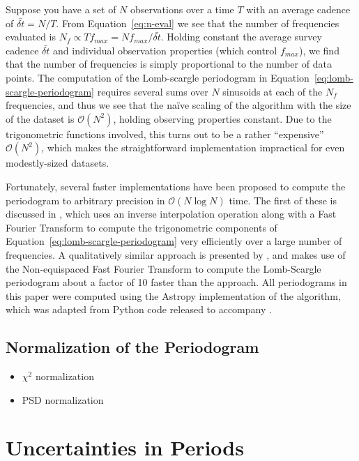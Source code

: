 \documentclass[preprint]{aastex}
\newcommand{\Eq}[1]{Equation~\ref{eq:#1}}
\newcommand{\eq}[1]{\Eq{#1}}
\newcommand{\sectlabel}[1]{\label{sect:#1}}
\begin{document}
Suppose you have a set of $N$ observations over a time $T$ with an average
cadence of $\bar{\delta t} = N/T$.
From \eq{n-eval} we see that the number of frequencies evaluated is
$N_f \propto T f_{max} = N f_{max} / \bar{\delta t}$.
Holding constant the average survey cadence $\bar{\delta t}$ and individual
observation properties (which control $f_{max}$), we find that the number of
frequencies is simply proportional to the number of data points.
The computation of the Lomb-scargle periodogram in \eq{lomb-scargle-periodogram}
requires several sums over $N$ sinusoids at each of the
$N_f$ frequencies, and thus we see that the
na{\"i}ve scaling of the algorithm with the size of the dataset is
$\mathcal{O}(N^2)$, holding observing properties constant.
Due to the trigonometric functions involved, this turns out to be a rather
``expensive'' $\mathcal{O}(N^2)$, which makes the straightforward
implementation impractical for even modestly-sized datasets.

Fortunately, several faster implementations have been proposed to compute the
periodogram to arbitrary precision in $\mathcal{O}(N\log N)$ time.
The first of these is discussed in \citet{Press89}, which uses an inverse
interpolation operation along with a Fast Fourier Transform to compute the
trigonometric components of \eq{lomb-scargle-periodogram} very efficiently over
a large number of frequencies.
A qualitatively similar approach is presented by \citet{Leroy2012},
and makes use of the Non-equispaced Fast Fourier Transform
\citep[NFFT, see][]{Keiner2009} to compute the Lomb-Scargle periodogram about
a factor of 10 faster than the \citet{Press89} approach.
All periodograms in this paper were computed using the Astropy
implementation of the \citet{Press89} algorithm, which was adapted from Python
code released to accompany \citet{VanderPlas2015}.


\subsection{Normalization of the Periodogram}

\begin{itemize}
  \item $\chi^2$ normalization
  \item PSD normalization
\end{itemize}


\section{Uncertainties in Periods}
\sectlabel{uncertainties}
\end{document}
